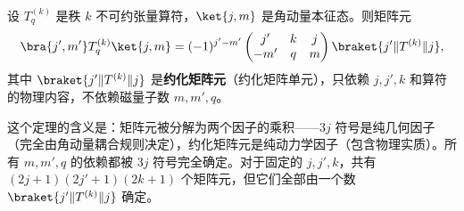 \begin{theorem}
\label{thm:wigner-eckart-angular}
设 $T^{(k)}_q$ 是秩 $k$ 不可约张量算符，$\ket{j,m}$ 是角动量本征态。则矩阵元
\begin{equation}
\bra{j',m'}T^{(k)}_q\ket{j,m}
=(-1)^{j'-m'}\begin{pmatrix}j'&k&j\\-m'&q&m\end{pmatrix}\braket{j'\|T^{(k)}\|j},
\label{eq:wigner-eckart}
\end{equation}
其中 $\braket{j'\|T^{(k)}\|j}$ 是\textbf{约化矩阵元}（约化矩阵单元），只依赖 $j,j',k$ 和算符的物理内容，不依赖磁量子数 $m,m',q$。
\end{theorem}
这个定理的含义是：矩阵元被分解为两个因子的乘积——$3j$ 符号是纯几何因子（完全由角动量耦合规则决定），约化矩阵元是纯动力学因子（包含物理实质）。所有 $m,m',q$ 的依赖都被 $3j$ 符号完全确定。对于固定的 $j,j',k$，共有 $(2j+1)(2j'+1)(2k+1)$ 个矩阵元，但它们全部由一个数 $\braket{j'\|T^{(k)}\|j}$ 确定。
\par\medskip
